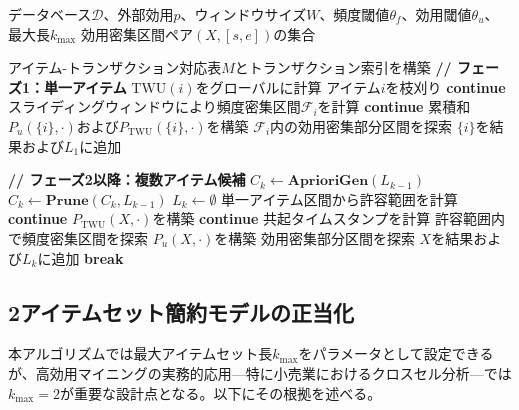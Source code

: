 \begin{algorithm}[t]
\caption{UDI-Miner：効用密集区間マイニング}
\label{alg:udi-miner}
\begin{algorithmic}[1]
\REQUIRE データベース$\mathcal{D}$、外部効用$p$、ウィンドウサイズ$W$、頻度閾値$\theta_f$、効用閾値$\theta_u$、最大長$k_{\max}$
\ENSURE 効用密集区間ペア$(X, [s,e])$の集合

\STATE アイテム-トランザクション対応表$M$とトランザクション索引を構築
\STATE \textbf{// フェーズ1：単一アイテム}
    \STATE $\text{TWU}(i)$をグローバルに計算
        \STATE アイテム$i$を枝刈り 
        \STATE \textbf{continue}
    \ENDIF
    \STATE スライディングウィンドウにより頻度密集区間$\mathcal{F}_i$を計算
        \STATE \textbf{continue}
    \ENDIF
    \STATE 累積和$P_u(\{i\}, \cdot)$および$P_{\text{TWU}}(\{i\}, \cdot)$を構築
    \STATE $\mathcal{F}_i$内の効用密集部分区間を探索
        \STATE $\{i\}$を結果および$L_1$に追加
    \ENDIF
\ENDFOR

\STATE \textbf{// フェーズ2以降：複数アイテム候補}
    \STATE $C_k \gets \textbf{AprioriGen}(L_{k-1})$
    \STATE $C_k \gets \textbf{Prune}(C_k, L_{k-1})$ 
    \STATE $L_k \gets \emptyset$
        \STATE 単一アイテム区間から許容範囲を計算
            \STATE \textbf{continue}
        \ENDIF
        \STATE $P_{\text{TWU}}(X, \cdot)$を構築
            \STATE \textbf{continue} 
        \ENDIF
        \STATE 共起タイムスタンプを計算
        \STATE 許容範囲内で頻度密集区間を探索
        \STATE $P_u(X, \cdot)$を構築
        \STATE 効用密集部分区間を探索
            \STATE $X$を結果および$L_k$に追加
        \ENDIF
    \ENDFOR
        \STATE \textbf{break}
    \ENDIF
\ENDFOR
\end{algorithmic}
\end{algorithm}

\subsection{2アイテムセット簡約モデルの正当化}
\label{subsec:l2-justification}

本アルゴリズムでは最大アイテムセット長$k_{\max}$をパラメータとして設定できるが、高効用マイニングの実務的応用---特に小売業におけるクロスセル分析---では$k_{\max} = 2$が重要な設計点となる。以下にその根拠を述べる。

